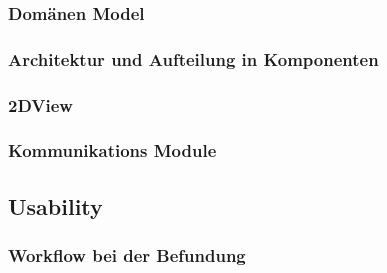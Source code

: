 \subsubsection{Domänen Model}
\label{sec:Domänen Model}

\subsubsection{Architektur und Aufteilung in Komponenten}
\label{sec:Architektur und Aufteilung in Komponenten}

\subsubsection{2DView}
\label{sec:2DView}


\subsubsection{Kommunikations Module}
\label{sec:Kommunikations Module}

\subsection{Usability}
\label{sec:Usability}

\subsubsection{Workflow bei der Befundung}
\label{sec:Workflow bei der Befundung}

